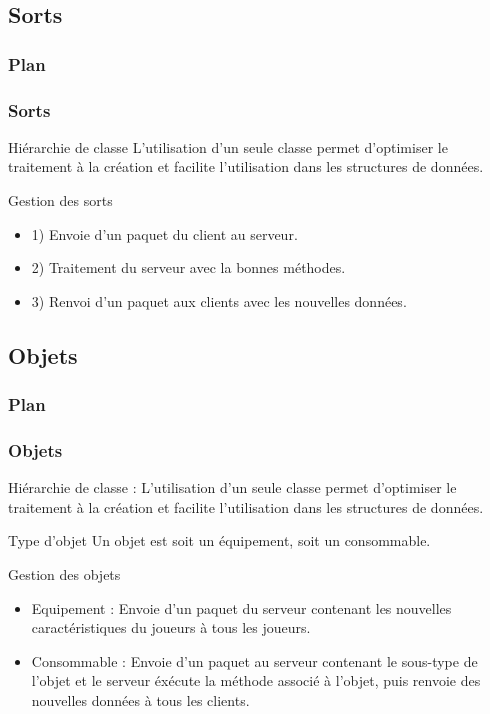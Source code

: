\documentclass[french]{beamer}
\begin{document}
\subsection{Sorts}

\begin{frame}
\frametitle{Plan}
\end{frame}

\begin{frame}
\frametitle{Sorts}
\begin{block}{Hiérarchie de classe}
L'utilisation d'un seule classe permet d'optimiser le traitement à la création et facilite l'utilisation dans les structures de données.
\end{block}

\begin{block}{Gestion des sorts}
\begin{itemize}
    \item 1) Envoie d'un paquet du client au serveur.
    \item 2) Traitement du serveur avec la bonnes méthodes.
    \item 3) Renvoi d'un paquet aux clients avec les nouvelles données.
\end{itemize}
\end{block}

\end{frame}

\subsection{Objets}

\begin{frame}
\frametitle{Plan}
\end{frame}

\begin{frame}
\frametitle{Objets}

\begin{block}{Hiérarchie de classe :}
L'utilisation d'un seule classe permet d'optimiser le traitement à la création et facilite l'utilisation dans les structures de données.
\end{block}

\begin{block}{Type d'objet}
Un objet est soit un équipement, soit un consommable.
\end{block}

\begin{block}{Gestion des objets} 
\begin{itemize}
\item Equipement : Envoie d'un paquet du serveur contenant les nouvelles caractéristiques du joueurs à tous les joueurs.
\item Consommable : Envoie d'un paquet au serveur contenant le sous-type de l'objet et le serveur éxécute la méthode associé à l'objet, puis renvoie des nouvelles données à tous les clients.
\end{itemize}
\end{block}

\end{frame}
\end{document}
